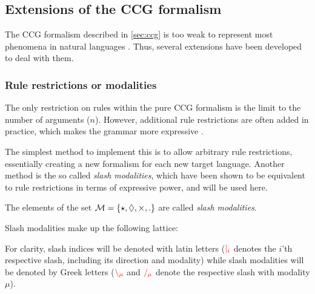 \documentclass[main.tex]{subfiles}
\begin{document}
\subsection{ Extensions of the CCG formalism}
\label{sec:hacks}

The CCG formalism described in \cref{sec:ccg} is too weak to represent most
phenomena in natural languages \cite{steedman}. Thus, several extensions have
been developed to deal with them.

\subsubsection{Rule restrictions or modalities}\label{hack:modal}
The only restriction on rules within the pure CCG formalism is the limit to
the number of arguments ($n$). However, additional rule restrictions are often
added in practice, which makes the grammar more expressive \cite{restrictions}.

The simplest method to implement this is to allow arbitrary rule restrictions,
essentially creating a new formalism for each new target language.
Another method is the so called \emph{slash modalities}, which have been shown
\cite{modal}
to be equivalent to rule restrictions in terms of expressive power, and will
be used here.

\begin{defn}
    The elements of the set
    $\mathcal{M} = \{ \star, \lozenge, \times, . \}$ are called
    \emph{slash modalities}.

    Slash modalities make up the following lattice:

    \begin{center}
    \end{center}
\end{defn}

For clarity, slash indices will be denoted with latin letters ($\textcolor{red}{|_{i}}$
denotes the $i$'th respective slash, including its direction and modality)
while slash modalities will be denoted by Greek letters
($\textcolor{red}{\backslash_{\mu}}$ and  $\textcolor{red}{/_{\mu}}$ denote the respective
slash with modality $\mu$).
\end{document}
